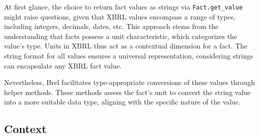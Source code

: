 At first glance, the choice to return fact values as strings via \texttt{Fact.get\_value} might raise questions, 
given that XBRL values encompass a range of types, including integers, decimals, dates, etc.
This approach stems from the understanding that facts possess a unit characteristic, which categorizes the value's type.
Units in XBRL thus act as a contextual dimension for a fact.
The string format for all values ensures a universal representation, considering strings can encapsulate any XBRL fact value.

Nevertheless, Brel facilitates type-appropriate conversions of these values through helper methods.
These methods assess the fact's unit to convert the string value into a more suitable data type, aligning with the specific nature of the value.

\subsection{Context}

